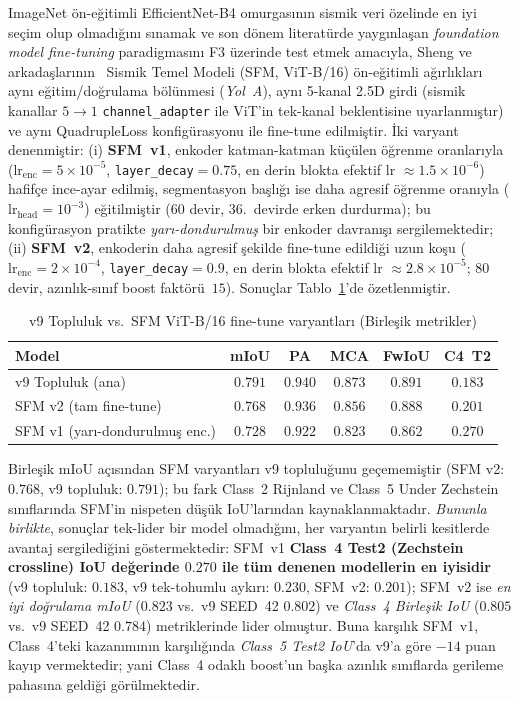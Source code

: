 \documentclass[conference,a4paper,10pt]{IEEEtran}
\begin{document}
ImageNet ön-eğitimli EfficientNet-B4 omurgasının sismik veri özelinde
en iyi seçim olup olmadığını sınamak ve son dönem literatürde yaygınlaşan
\emph{foundation model fine-tuning} paradigmasını F3 üzerinde test etmek
amacıyla, Sheng ve arkadaşlarının~\cite{sfm2024} Sismik Temel Modeli
(SFM, ViT-B/16) ön-eğitimli ağırlıkları aynı eğitim/doğrulama bölünmesi
(\emph{Yol~A}), aynı 5-kanal 2.5D girdi (sismik kanallar $5 \rightarrow 1$
\texttt{channel\_adapter} ile ViT'in tek-kanal beklentisine uyarlanmıştır)
ve aynı QuadrupleLoss konfigürasyonu ile fine-tune edilmiştir. İki varyant
denenmiştir: (i) \textbf{SFM~v1}, enkoder katman-katman küçülen öğrenme oranlarıyla
($\text{lr}_{\text{enc}}=5{\times}10^{-5}$, \texttt{layer\_decay}$=0.75$,
en derin blokta efektif lr $\approx 1.5{\times}10^{-6}$) hafifçe ince-ayar
edilmiş, segmentasyon başlığı ise daha agresif öğrenme oranıyla
($\text{lr}_{\text{head}}=10^{-3}$) eğitilmiştir (60 devir, 36.\ devirde
erken durdurma); bu konfigürasyon pratikte \emph{yarı-dondurulmuş} bir
enkoder davranışı sergilemektedir; (ii) \textbf{SFM~v2}, enkoderin daha
agresif şekilde fine-tune edildiği uzun koşu
($\text{lr}_{\text{enc}}=2{\times}10^{-4}$, \texttt{layer\_decay}$=0.9$,
en derin blokta efektif lr $\approx 2.8{\times}10^{-5}$; $80$ devir,
azınlık-sınıf boost faktörü~$15$). Sonuçlar Tablo~\ref{tab:sfm}'de
özetlenmiştir.

\begin{table}[!t]
\renewcommand{\arraystretch}{1.2}
\caption{v9 Topluluk vs.\ SFM ViT-B/16 fine-tune varyantları (Birleşik metrikler)}
\label{tab:sfm}
\centering
\begin{tabular}{lccccc}
\toprule
\textbf{Model} & \textbf{mIoU} & \textbf{PA} & \textbf{MCA} & \textbf{FwIoU} & \textbf{C4~T2} \\
\midrule
v9 Topluluk (ana)        & $\mathbf{0.791}$ & $\mathbf{0.940}$ & $\mathbf{0.873}$ & $\mathbf{0.891}$ & $0.183$ \\
SFM v2 (tam fine-tune)   & $0.768$ & $0.936$ & $0.856$ & $0.888$ & $0.201$ \\
\rowcolor{green!10}
SFM v1 (yarı-dondurulmuş enc.) & $0.728$ & $0.922$ & $0.823$ & $0.862$ & $\mathbf{0.270}$ \\
\bottomrule
\end{tabular}
\end{table}

Birleşik mIoU açısından SFM varyantları v9 topluluğunu geçememiştir
(SFM v2: $0.768$, v9 topluluk: $0.791$); bu fark Class~2 Rijnland ve
Class~5 Under Zechstein sınıflarında SFM'in nispeten düşük IoU'larından
kaynaklanmaktadır. \emph{Bununla birlikte}, sonuçlar tek-lider bir model
olmadığını, her varyantın belirli kesitlerde avantaj sergilediğini
göstermektedir: SFM~v1 \textbf{Class~4 Test2 (Zechstein crossline) IoU
değerinde $0.270$ ile tüm denenen modellerin en iyisidir} (v9 topluluk:
$0.183$, v9 tek-tohumlu aykırı: $0.230$, SFM~v2: $0.201$); SFM~v2 ise
\emph{en iyi doğrulama mIoU} ($0.823$ vs.\ v9 SEED~42 $0.802$) ve
\emph{Class~4 Birleşik IoU} ($0.805$ vs.\ v9 SEED~42 $0.784$)
metriklerinde lider olmuştur. Buna karşılık SFM~v1, Class~4'teki kazanımının
karşılığında \emph{Class~5 Test2 IoU}'da v9'a göre $-14$ puan kayıp
vermektedir; yani Class~4 odaklı boost'un başka azınlık sınıflarda
gerileme pahasına geldiği görülmektedir.
\end{document}
